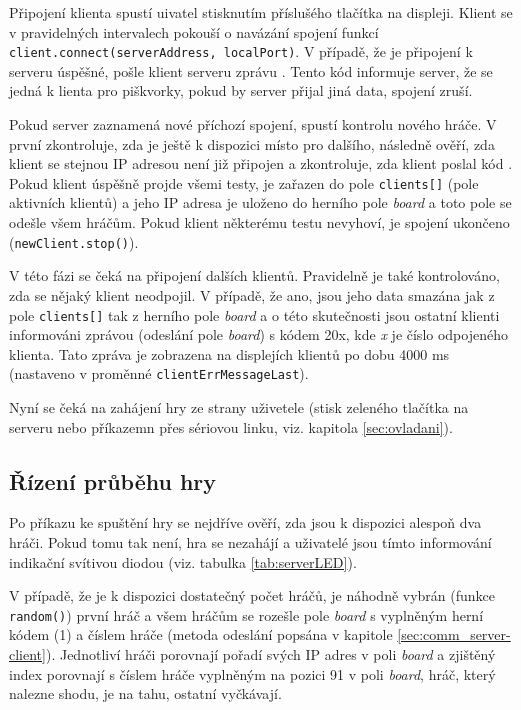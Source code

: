 Připojení klienta spustí uivatel stisknutím příslušého tlačítka na displeji. Klient se v pravidelných intervalech pokouší o navázání spojení funkcí \mbox{\texttt{client.connect(serverAddress, localPort)}}. V případě, že je připojení k serveru úspěšné, pošle klient serveru zprávu . Tento kód informuje server, že se jedná k lienta pro piškvorky, pokud by server přijal jiná data, spojení zruší.

Pokud server zaznamená nové příchozí spojení, spustí kontrolu nového hráče. V první zkontroluje, zda je ještě k dispozici místo pro dalšího, následně ověří, zda klient se stejnou IP adresou není již připojen a zkontroluje, zda klient poslal kód . Pokud klient úspěšně projde všemi testy, je zařazen do pole \texttt{clients[]} (pole aktivních klientů) a jeho IP adresa je uloženo do herního pole \textit{board} a toto pole se odešle všem hráčům. Pokud klient některému testu nevyhoví, je spojení ukončeno (\texttt{newClient.stop()}).

V této fázi se čeká na připojení dalších klientů. Pravidelně je také kontrolováno, zda se nějaký klient neodpojil. V případě, že ano, jsou jeho data smazána jak z pole \texttt{clients[]} tak z herního pole \textit{board} a o této skutečnosti jsou ostatní klienti informováni zprávou (odeslání pole \textit{board}) s kódem 20x, kde \textit{x} je číslo odpojeného klienta. Tato zpráva je zobrazena na displejích klientů po dobu 4000 ms (nastaveno v proměnné \texttt{clientErrMessageLast}).

Nyní se čeká na zahájení hry ze strany uživetele (stisk zeleného tlačítka na serveru nebo příkazemn přes sériovou linku, viz. kapitola \ref{sec:ovladani}).

\subsection{Řízení průběhu hry}
Po příkazu ke spuštění hry se nejdříve ověří, zda jsou k dispozici alespoň dva hráči. Pokud tomu tak není, hra se nezahájí a uživatelé jsou tímto informování indikační svítivou diodou (viz. tabulka \ref{tab:serverLED}).

V případě, že je k dispozici dostatečný počet hráčů, je náhodně vybrán (funkce \texttt{random()}) první hráč a všem hráčům se rozešle pole \textit{board} s vyplněným herní kódem (1) a číslem hráče (metoda odeslání popsána v kapitole \ref{sec:comm_server-client}). Jednotliví hráči porovnají pořadí svých IP adres v poli \textit{board} a zjištěný index porovnají s číslem hráče vyplněným na pozici 91 v poli \textit{board}, hráč, který nalezne shodu, je na tahu, ostatní vyčkávají.

